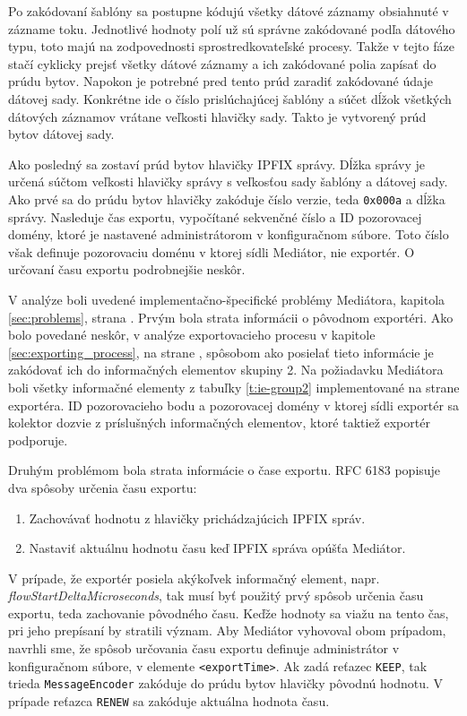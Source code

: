Po zakódovaní šablóny sa postupne kódujú všetky dátové záznamy obsiahnuté v zázname toku. Jednotlivé 
hodnoty polí už sú správne zakódované podľa dátového typu, toto majú na zodpovednosti sprostredkovateľské
procesy. Takže v tejto fáze stačí cyklicky prejsť všetky dátové záznamy a ich zakódované polia zapísať 
do prúdu bytov. Napokon je potrebné pred tento prúd zaradiť zakódované údaje dátovej sady. Konkrétne
ide o číslo prislúchajúcej šablóny a súčet dĺžok všetkých dátových záznamov vrátane veľkosti hlavičky sady.
Takto je vytvorený prúd bytov dátovej sady.

Ako posledný sa zostaví prúd bytov hlavičky IPFIX správy. Dĺžka správy je určená súčtom veľkosti hlavičky
správy s veľkosťou sady šablóny a dátovej sady. Ako prvé sa do prúdu bytov hlavičky zakóduje číslo 
verzie, teda \verb|0x000a| a dĺžka správy. Nasleduje čas exportu, vypočítané sekvenčné číslo a ID 
pozorovacej domény, ktoré je nastavené administrátorom v konfiguračnom súbore. Toto číslo však definuje
pozorovaciu doménu v ktorej sídli Mediátor, nie exportér. O určovaní času exportu podrobnejšie neskôr.

V analýze boli uvedené implementačno-špecifické problémy Mediátora, kapitola \ref{sec:problems}, strana 
\pageref{sec:problems}. Prvým bola strata informácii o pôvodnom exportéri. Ako bolo povedané neskôr, v 
analýze
exportovacieho procesu v kapitole \ref{sec:exporting_process}, na strane \pageref{sec:exporting_process},
spôsobom ako posielať tieto informácie je zakódovať ich do informačných elementov skupiny 2. Na požiadavku
Mediátora boli všetky informačné elementy z tabuľky \ref{t:ie-group2} implementované na strane exportéra.
ID pozorovacieho bodu a pozorovacej domény v ktorej sídli exportér sa kolektor dozvie z príslušných 
informačných elementov, ktoré taktiež exportér podporuje. 

Druhým problémom bola strata informácie o čase exportu. RFC 6183 \citep{rfc6183} popisuje dva spôsoby 
určenia času exportu:
\begin{enumerate}
 \item Zachovávať hodnotu z hlavičky prichádzajúcich IPFIX správ.
 \item Nastaviť aktuálnu hodnotu času keď IPFIX správa opúšťa Mediátor.
\end{enumerate}
V prípade, že exportér posiela akýkoľvek  informačný element, napr. \emph{flowStartDeltaMicroseconds},
tak musí byť použitý prvý spôsob určenia času exportu, teda zachovanie pôvodného času. Keďže 
 hodnoty sa viažu na tento čas, pri jeho prepísaní by stratili význam. Aby Mediátor 
vyhovoval obom prípadom, navrhli sme, že spôsob určovania času exportu definuje administrátor v 
konfiguračnom súbore, v elemente \verb|<exportTime>|. 
Ak zadá reťazec \verb|KEEP|, tak trieda \verb|MessageEncoder| zakóduje do prúdu bytov hlavičky pôvodnú
hodnotu. V prípade reťazca \verb|RENEW| sa zakóduje aktuálna hodnota času.

